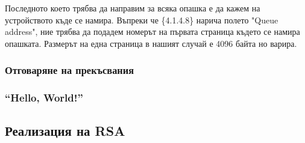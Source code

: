 Последното което трябва да направим за всяка опашка е да кажем на устройството къде се намира. Въпреки че \{4.1.4.8\} нарича полето "Queue address", ние трябва да подадем номерът на първата страница където се намира опашката. Размерът на една страница в нашият случай е 4096 байта но варира.




\subsubsection{Отговаряне на прекъсвания}

\subsubsection{``Hello, World!''}

\subsection{Реализация на RSA}

